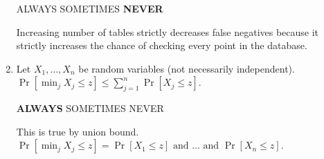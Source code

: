 \documentclass[10pt]{article}
\begin{document}
\begin{enumerate}[label=(\alph*)]
	ALWAYS\hspace{1em} SOMETIMES\hspace{1em} \textbf{NEVER}
	
	Increasing number of tables strictly decreases false negatives because it strictly increases the chance of checking every point in the database.
	
	
	\item Let $X_1, \ldots, X_n$ be random variables (not necessarily independent). $\Pr\left[\min_j X_j \leq z\right] \leq \sum_{j=1}^n \Pr\left[X_j \leq z\right]$.
	
	\textbf{ALWAYS}\hspace{1em} SOMETIMES\hspace{1em} NEVER
	
	This is true by union bound. $\Pr\left[\min_j X_j \leq z\right] = \Pr\left[X_1 \leq z\right] \text{ and } \ldots \text{ and } \Pr\left[X_n \leq z\right]$.
\end{enumerate}
\end{document}
